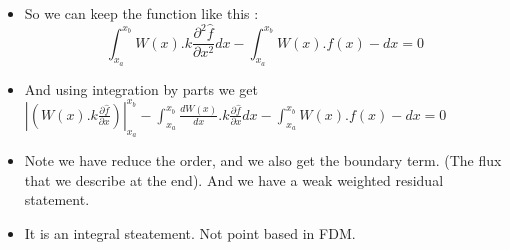	\begin{frame}
		\begin{itemize}
			\item So we can keep the function like this :
			\begin{equation}   
			\int_{x_a}^{x_b} W(x).k \frac{\partial^2 \hat{f}}{\partial x^2} dx- \int_{x_a}^{x_b} W(x).f(x) - dx = 0
			\end{equation}
			\item And using integration by parts we get \\
			$	\left|\left(W(x).k \frac{\partial \hat{f}}{\partial x} \right) \right|^{x_b}_{x_a}- \int_{x_a}^{x_b} \frac{dW(x)}{dx}.k \frac{\partial \hat{f}}{\partial x} dx -  \int_{x_a}^{x_b} W(x).f(x) - dx = 0$
			\item Note we have reduce the order, and we also get the boundary term. (The flux that we describe at the end). And we have a weak weighted residual statement.
			\item It is an integral steatement. Not point based in FDM.  
		\end{itemize}
	\end{frame}


